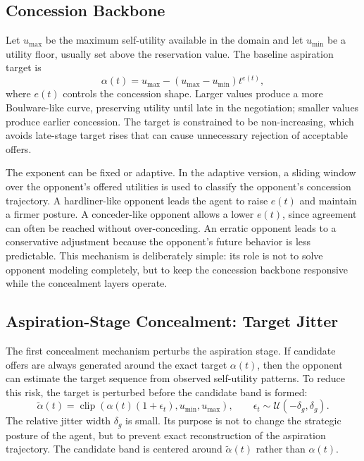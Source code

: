 \documentclass[runningheads]{llncs}
\begin{document}
\subsection{Concession Backbone}

Let $u_{\max}$ be the maximum self-utility available in the domain and let $u_{\min}$ be a utility floor, usually set above the reservation value. The baseline aspiration target is
\begin{equation}
\alpha(t) = u_{\max} - (u_{\max} - u_{\min})t^{e(t)},
\label{eq:aspiration}
\end{equation}
where $e(t)$ controls the concession shape. Larger values produce a more Boulware-like curve, preserving utility until late in the negotiation; smaller values produce earlier concession. The target is constrained to be non-increasing, which avoids late-stage target rises that can cause unnecessary rejection of acceptable offers.

The exponent can be fixed or adaptive. In the adaptive version, a sliding window over the opponent's offered utilities is used to classify the opponent's concession trajectory. A hardliner-like opponent leads the agent to raise $e(t)$ and maintain a firmer posture. A conceder-like opponent allows a lower $e(t)$, since agreement can often be reached without over-conceding. An erratic opponent leads to a conservative adjustment because the opponent's future behavior is less predictable. This mechanism is deliberately simple: its role is not to solve opponent modeling completely, but to keep the concession backbone responsive while the concealment layers operate.

\subsection{Aspiration-Stage Concealment: Target Jitter}

The first concealment mechanism perturbs the aspiration stage. If candidate offers are always generated around the exact target $\alpha(t)$, then the opponent can estimate the target sequence from observed self-utility patterns. To reduce this risk, the target is perturbed before the candidate band is formed:
\begin{equation}
\tilde{\alpha}(t)=
\operatorname{clip}\!\left(\alpha(t)(1+\epsilon_t),u_{\min},u_{\max}\right),
\qquad
\epsilon_t \sim \mathcal{U}(-\delta_g,\delta_g).
\label{eq:jitter}
\end{equation}
The relative jitter width $\delta_g$ is small. Its purpose is not to change the strategic posture of the agent, but to prevent exact reconstruction of the aspiration trajectory. The candidate band is centered around $\tilde{\alpha}(t)$ rather than $\alpha(t)$.
\end{document}
